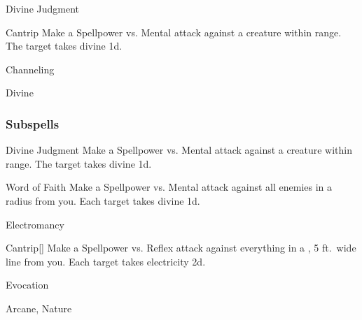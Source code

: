 \newpage
\begin{spellsection}{Divine Judgment}

\begin{spellheader}
\end{spellheader}


\begin{ability}{Cantrip}
Make a Spellpower vs. Mental attack against a creature within \rngmed range.
\hit The target takes divine  \minus1d.
\end{ability}




 Channeling

 Divine
\end{spellsection}


\subsubsection{Subspells}


\begin{ability}[\nth{1}]{Divine Judgment}
Make a Spellpower vs. Mental attack against a creature within \rngmed range.
\hit The target takes divine  \plus1d.
\end{ability}
\vspace{0.25em}


\begin{ability}[\nth{2}]{Word of Faith}
Make a Spellpower vs. Mental attack against all enemies in a \areamed radius from you.
\hit Each target takes divine  \minus1d.
\end{ability}
\vspace{0.25em}

\newpage
\begin{spellsection}{Electromancy}

\begin{spellheader}
\end{spellheader}


\begin{ability}{Cantrip}[]
Make a Spellpower vs. Reflex attack against everything in a \areamed, 5 ft.\ wide line from you.
\hit Each target takes electricity  \minus2d.
\end{ability}




 Evocation

 Arcane, Nature
\end{spellsection}


